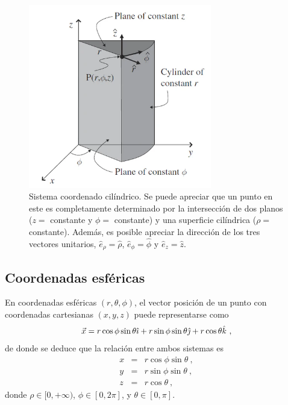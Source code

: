 \begin{figure}[htbp]
    \centering
    \includegraphics[width=8cm]{Figuras/Lineas-coordenadas-cilindricas.png}
    \caption{Sistema coordenado cilíndrico. Se puede apreciar que un punto en este es completamente determinado por la intersección de dos planos ($z =$ constante y $\phi = $ constante) y una superficie cilíndrica ($\rho = $ constante). Además, es posible apreciar la dirección de los tres vectores unitarios, $\hat{e}_\rho = \hat{\rho}$, $\hat{e}_\phi = \hat{\phi}$ y $\hat{e}_z = \hat{z}$.}
\end{figure}


\subsection{Coordenadas esféricas}

En coordenadas esféricas $(r, \theta, \phi)$, el vector posición de un punto con coordenadas cartesianas $(x,y,z)$ puede representarse como 
\begin{equation}
    \vec{x} = r \cos \phi \sin \theta \hat{\imath} + r \sin \phi \sin \theta \hat{\jmath} + r \cos \theta \hat{k} \ ,
\end{equation}
de donde se deduce que la relación entre ambos sistemas es 
\begin{equation}
    \begin{array}{rcl}
        x & = & r \cos \phi \sin \theta \ , \\
        y & = & r \sin \phi \sin \theta \ , \\
        z & = & r \cos \theta \ ,
    \end{array}
\end{equation} 
donde $\rho \in [0, +\infty)$, $\phi \in [0, 2\pi]$, y $\theta \in [0, \pi]$.

